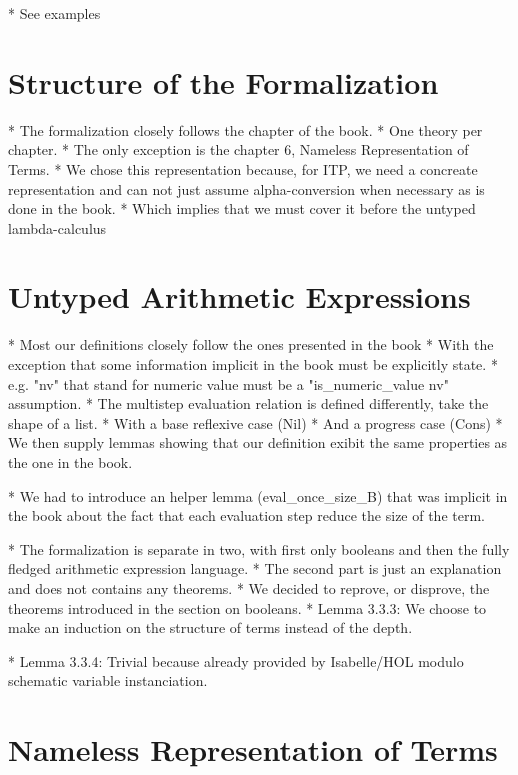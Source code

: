 \documentclass[a4paper, oneside, 12pt, titlepage]{article}
\begin{document}
  * See examples

\section{Structure of the Formalization}
\label{sec:structure-of-formalization}

  * The formalization closely follows the chapter of the book.
    * One theory per chapter.
    * The only exception is the chapter 6, Nameless Representation of Terms.
      * We chose this representation because, for ITP, we need a concreate representation and can
        not just assume alpha-conversion when necessary as is done in the book.
      * Which implies that we must cover it before the untyped lambda-calculus

\section{Untyped Arithmetic Expressions}
\label{sec:untyped-arith-expr}

  * Most our definitions closely follow the ones presented in the book
    * With the exception that some information implicit in the book must be explicitly state.
      * e.g. "nv" that stand for numeric value must be a "is\_numeric\_value nv" assumption.
    * The multistep evaluation relation is defined differently, take the shape of a list.
      * With a base reflexive case (Nil)
      * And a progress case (Cons)
      * We then supply lemmas showing that our definition exibit the same properties as the one in
        the book.

  * We had to introduce an helper lemma (eval\_once\_size\_B) that was implicit in the book about the
    fact that each evaluation step reduce the size of the term.

  * The formalization is separate in two, with first only booleans and then the fully fledged
    arithmetic expression language.
    * The second part is just an explanation and does not contains any theorems.
      * We decided to reprove, or disprove, the theorems introduced in the section on booleans.
  * Lemma 3.3.3: We choose to make an induction on the structure of terms instead of the depth.

  * Lemma 3.3.4: Trivial because already provided by Isabelle/HOL modulo schematic variable
    instanciation.

\section{Nameless Representation of Terms}
\label{sec:nameless-rep-of-terms}
\end{document}
